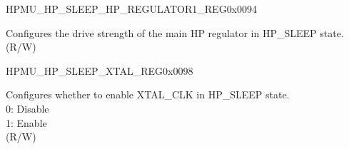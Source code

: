 \begin{register}{H}{PMU\_HP\_SLEEP\_HP\_REGULATOR1\_REG}{0x0094}\label{regdesc:PMUHPSLEEPHPREGULATOR1REG}
%
%
\regnewline%
\begin{regdesc}\begin{reglist}
\label{fielddesc:PMUHPSLEEPHPREGULATORDRVB}\item [PMU\_HP\_SLEEP\_HP\_REGULATOR\_DRV\_B] Configures the drive strength of the main HP regulator in HP\_SLEEP state. (R/W)
\end{reglist}\end{regdesc}
\end{register}


\begin{register}{H}{PMU\_HP\_SLEEP\_XTAL\_REG}{0x0098}\label{regdesc:PMUHPSLEEPXTALREG}
%
%
\regnewline%
\begin{regdesc}\begin{reglist}
\label{fielddesc:PMUHPSLEEPXPDXTAL}\item [PMU\_HP\_SLEEP\_XPD\_XTAL] Configures whether to enable XTAL\_CLK in HP\_SLEEP state.\\
0: Disable\\
1: Enable\\
(R/W)
\end{reglist}\end{regdesc}
\end{register}



